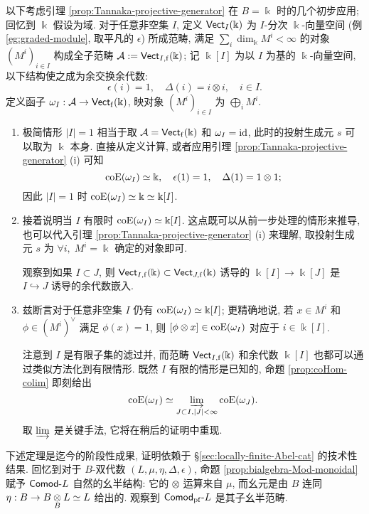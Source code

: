 \begin{example}\label{eg:Tannakian-I-graded-0}
	以下考虑引理 \ref{prop:Tannaka-projective-generator} 在 $B = \Bbbk$ 时的几个初步应用; 回忆到 $\Bbbk$ 假设为域. 对于任意非空集 $I$, 定义 $\mathsf{Vect}_I(\Bbbk)$ 为 $I$-分次 $\Bbbk$-向量空间 (例 \ref{eg:graded-module}, 取平凡的 $\epsilon$) 所成范畴, 满足 $\sum_i \dim_{\Bbbk} M^i < \infty$ 的对象 $(M^i)_{i \in I}$ 构成全子范畴 $\mathcal{A} := \mathsf{Vect}_{I, \mathrm{f}}(\Bbbk)$; 记 $\Bbbk[I]$ 为以 $I$ 为基的 $\Bbbk$-向量空间, 以下结构使之成为余交换余代数:
	\[ \epsilon(i) = 1, \quad \Delta(i) = i \otimes i, \quad i \in I. \]
	定义函子 $\omega_I: \mathcal{A} \to \mathsf{Vect}_{\mathrm{f}}(\Bbbk)$, 映对象 $(M^i)_{i \in I}$ 为 $\bigoplus_i M^i$.
	\begin{enumerate}
		\item 极简情形 $|I|=1$ 相当于取 $\mathcal{A} = \mathsf{Vect}_{\mathrm{f}}(\Bbbk)$ 和 $\omega_I = \mathrm{id}$, 此时的投射生成元 $s$ 可以取为 $\Bbbk$ 本身. 直接从定义计算, 或者应用引理 \ref{prop:Tannaka-projective-generator} (i) 可知
		\[ \operatorname{coE}(\omega_I) \simeq \Bbbk, \quad \epsilon(1) = 1, \quad \Delta(1) = 1 \otimes 1; \]
		因此 $|I|=1$ 时 $\operatorname{coE}(\omega_I) \simeq \Bbbk \simeq \Bbbk[I]$.
		
		\item 接着说明当 $I$ 有限时 $\operatorname{coE}(\omega_I) \simeq \Bbbk[I]$. 这点既可以从前一步处理的情形来推导, 也可以代入引理 \ref{prop:Tannaka-projective-generator} (i) 来理解, 取投射生成元 $s$ 为 $\forall i, \; M^i = \Bbbk$ 确定的对象即可.
		
		观察到如果 $I \subset J$, 则 $\mathsf{Vect}_{I, \mathrm{f}}(\Bbbk) \subset \mathsf{Vect}_{J, \mathrm{f}}(\Bbbk)$ 诱导的 $\Bbbk[I] \to \Bbbk[J]$ 是 $I \hookrightarrow J$ 诱导的余代数嵌入.
	
		\item 兹断言对于任意非空集 $I$ 仍有 $\operatorname{coE}(\omega_I) \simeq \Bbbk[I]$; 更精确地说, 若 $x \in M^i$ 和 $\phi \in (M^i)^\vee$ 满足 $\phi(x) = 1$, 则 $[\phi \otimes x] \in \operatorname{coE}(\omega_I)$ 对应于 $i \in \Bbbk[I]$.
		
		注意到 $I$ 是有限子集的滤过并, 而范畴 $\mathsf{Vect}_{I, \mathrm{f}}(\Bbbk)$ 和余代数 $\Bbbk[I]$ 也都可以通过类似方法化到有限情形. 既然 $I$ 有限的情形是已知的, 命题 \ref{prop:coHom-colim} 即刻给出
		\[ \operatorname{coE}(\omega_I) \simeq \varinjlim_{J \subset I, |J| < \infty} \operatorname{coE}(\omega_J). \]
		取 $\varinjlim$ 是关键手法, 它将在稍后的证明中重现.
	\end{enumerate}
\end{example}

下述定理是迄今的阶段性成果, 证明依赖于 \S\ref{sec:locally-finite-Abel-cat} 的技术性结果. 回忆到对于 $B$-双代数 $(L, \mu, \eta, \Delta, \epsilon)$, 命题 \ref{prop:bialgebra-Mod-monoidal} 赋予 $\mathsf{Comod}\text{-}L$ 自然的幺半结构: 它的 $\otimes$ 运算来自 $\mu$, 而幺元是由 $B$ 连同 $\eta: B \to B \underset{B}{\otimes} L \simeq L$ 给出的. 观察到 $\mathsf{Comod}_{\mathrm{pf}}\text{-}L$ 是其子幺半范畴.

